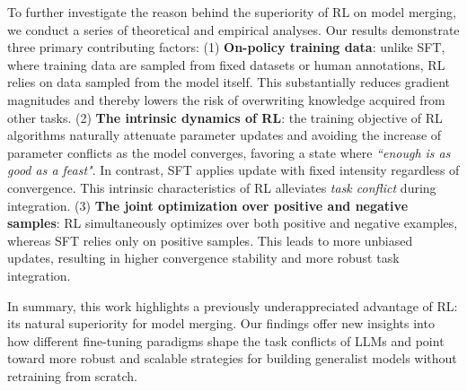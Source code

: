 \documentclass{article} %
\begin{document}
To further investigate the reason behind the superiority of RL on model merging, we conduct a series of theoretical and empirical analyses. Our results demonstrate three primary contributing factors: (1) \textbf{On-policy training data}: unlike SFT, where training data are sampled from fixed datasets or human annotations, RL relies on data sampled from the model itself. This substantially reduces gradient magnitudes and thereby lowers the risk of overwriting knowledge acquired from other tasks. (2) \textbf{The intrinsic dynamics of RL}: the training objective of RL algorithms naturally attenuate parameter updates and avoiding the increase of parameter conflicts as the model converges, favoring a state where \textit{``enough is as good as a feast"}. In contrast, SFT applies update with fixed intensity regardless of convergence. This intrinsic characteristics of RL alleviates \textit{task conflict} during integration. (3) \textbf{The joint optimization over positive and negative samples}: RL simultaneously optimizes over both positive and negative examples, whereas SFT relies only on positive samples. This leads to more unbiased updates, resulting in higher convergence stability and more robust task integration.




In summary, this work highlights a previously underappreciated advantage of RL: its natural superiority for model merging. Our findings offer new insights into how different fine-tuning paradigms shape the task conflicts of LLMs and point toward more robust and scalable strategies for building generalist models without retraining from scratch.
\end{document}
